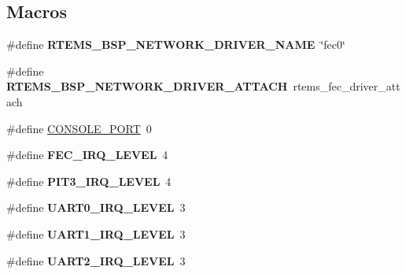 \subsection*{Macros}
\begin{DoxyCompactItemize}
\item 
\mbox{\label{group__RTEMSBSPsM68kMCF5329_ga86d4f9aa98431100692e31068070a8df}} 
\#define {\bfseries R\+T\+E\+M\+S\+\_\+\+B\+S\+P\+\_\+\+N\+E\+T\+W\+O\+R\+K\+\_\+\+D\+R\+I\+V\+E\+R\+\_\+\+N\+A\+ME}~\char`\"{}fec0\char`\"{}
\item 
\mbox{\label{group__RTEMSBSPsM68kMCF5329_gadde0d66aef9442971dde465292ac14e6}} 
\#define {\bfseries R\+T\+E\+M\+S\+\_\+\+B\+S\+P\+\_\+\+N\+E\+T\+W\+O\+R\+K\+\_\+\+D\+R\+I\+V\+E\+R\+\_\+\+A\+T\+T\+A\+CH}~rtems\+\_\+fec\+\_\+driver\+\_\+attach
\item 
\#define \mbox{\hyperlink{group__RTEMSBSPsM68kMCF5329_ga0859abd84f64f7f09ad95a4079b06f41}{C\+O\+N\+S\+O\+L\+E\+\_\+\+P\+O\+RT}}~0
\item 
\mbox{\label{group__RTEMSBSPsM68kMCF5329_gad112ebc14ecfb90715c07100a7eadb07}} 
\#define {\bfseries F\+E\+C\+\_\+\+I\+R\+Q\+\_\+\+L\+E\+V\+EL}~4
\item 
\mbox{\label{group__RTEMSBSPsM68kMCF5329_ga70573852241aab02cc64e2c8745cd24f}} 
\#define {\bfseries P\+I\+T3\+\_\+\+I\+R\+Q\+\_\+\+L\+E\+V\+EL}~4
\item 
\mbox{\label{group__RTEMSBSPsM68kMCF5329_ga3f6403d98a553ab7e5246ace59655611}} 
\#define {\bfseries U\+A\+R\+T0\+\_\+\+I\+R\+Q\+\_\+\+L\+E\+V\+EL}~3
\item 
\mbox{\label{group__RTEMSBSPsM68kMCF5329_ga8db7b2e20155ab9adf447660e92010b1}} 
\#define {\bfseries U\+A\+R\+T1\+\_\+\+I\+R\+Q\+\_\+\+L\+E\+V\+EL}~3
\item 
\mbox{\label{group__RTEMSBSPsM68kMCF5329_ga4fa66263959fe836ffc8cc89554a22e7}} 
\#define {\bfseries U\+A\+R\+T2\+\_\+\+I\+R\+Q\+\_\+\+L\+E\+V\+EL}~3
\end{DoxyCompactItemize}
